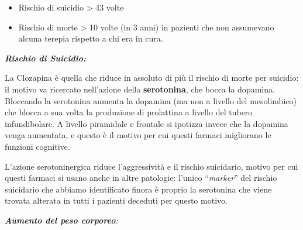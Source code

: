 \begin{itemize}
\item
  Rischio di suicidio \textgreater{} 43 volte
\item
  Rischio di morte \textgreater{} 10 volte (in 3 anni) in pazienti che
  non assumevano alcuna terepia rispetto a chi era in cura.
\end{itemize}

\textbf{\emph{Rischio di Suicidio:}}

La Clozapina è quella che riduce in assoluto di più il rischio di morte
per suicidio: il motivo va ricercato nell'azione della
\textbf{serotonina}, che bocca la dopamina. Bloccando la serotonina
aumenta la dopamina (ma non a livello del mesolimbico) che blocca a sua
volta la produzione di prolattina a livello del tubero infundibolare. A
livello piramidale e frontale si ipotizza invece che la dopamina venga
aumentata, e questo è il motivo per cui questi farmaci migliorano le
funzioni cognitive.

L'azione serotoninergica riduce l'aggressività e il rischio suicidario,
motivo per cui questi farmaci si usano anche in altre patologie: l'unico
``\emph{marker}'' del rischio suicidario che abbiamo identificato finora
è proprio la serotonina che viene trovata alterata in tutti i pazienti
deceduti per questo motivo.

\emph{\textbf{Aumento del peso corporeo}:}

